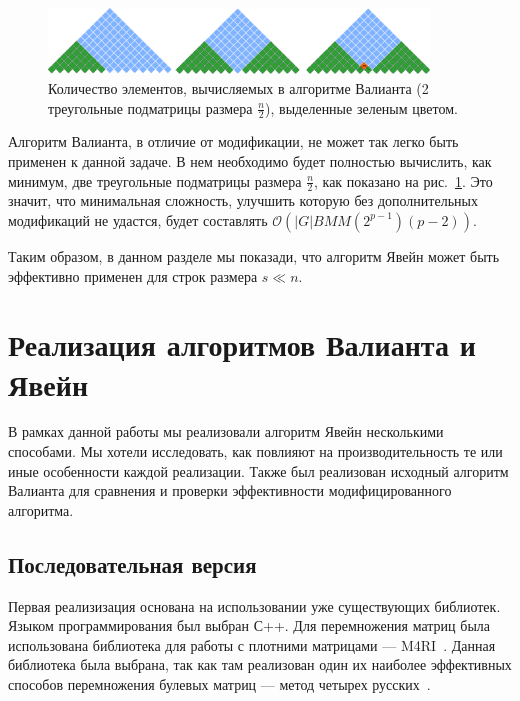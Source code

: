 \begin{figure}[h]
\vspace{3mm}
 \begin{center}
 \includegraphics[width=0.9\textwidth]{Susanina/pics/valsubstring.pdf}
    \caption{Количество элементов, вычисляемых в алгоритме Валианта (2  треугольные подматрицы размера $\frac{n}{2}$), выделенные зеленым цветом.}
    \label{fig5}
 \end{center}
\vspace{-8mm}
\end{figure}

Алгоритм Валианта, в отличие от модификации, не может так легко быть применен к данной задаче. В нем необходимо будет полностью вычислить, как минимум, две треугольные подматрицы размера $\frac{n}{2}$, как показано на рис.~\ref{fig5}.
Это значит, что минимальная сложность, улучшить которую без дополнительных модификаций не удастся, будет составлять $\mathcal{O}(|G|BMM(2^{p - 1})(p - 2))$.

Таким образом, в данном разделе мы показади, что алгоритм Явейн может быть эффективно применен для строк размера $s \ll n$.



\section{Реализация алгоритмов Валианта и Явейн}

В рамках данной работы мы реализовали алгоритм Явейн несколькими способами. Мы хотели исследовать, как повлияют на производительность те или иные особенности каждой реализации. Также был реализован исходный алгоритм Валианта для сравнения и проверки эффективности модифицированного алгоритма.

\subsection{Последовательная версия}

Первая реализизация основана на использовании уже существующих библиотек.
Языком программирования был выбран С++. Для перемножения матриц была использована библиотека для работы с плотними матрицами --- M4RI~\cite{M4RI}.
Данная библиотека была выбрана, так как там реализован один их наиболее эффективных способов перемножения булевых матриц --- метод четырех русских~\cite{albrechtefficient, arlazarov1970economical}.

